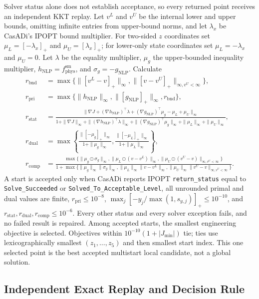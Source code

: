\documentclass[a4paper,fleqn]{cas-sc}
\begin{document}
Solver status alone does not establish acceptance, so every returned point receives an independent KKT replay. Let $v^L$ and $v^U$ be the internal lower and upper bounds, omitting infinite entries from upper-bound norms, and let $\lambda_x$ be CasADi's IPOPT bound multiplier. For two-sided $z$ coordinates set $\mu_L=[-\lambda_x]_+$ and $\mu_U=[\lambda_x]_+$; for lower-only state coordinates set $\mu_L=-\lambda_x$ and $\mu_U=0$. Let $\lambda$ be the equality multiplier, $\mu_g$ the upper-bounded inequality multiplier, $h_{\mathrm{NLP}}=f_{\mathrm{phys}}^{\mathrm{sm}}$, and $\sigma_g=-g_{\mathrm{NLP}}$. Calculate
\begin{align}
r_{\mathrm{bnd}}&=\max\{\|[v^L-v]_+\|_\infty,
\|[v-v^U]_+\|_{\infty,v^U<\infty}\},\\
r_{\mathrm{pri}}&=\max\{\|h_{\mathrm{NLP}}\|_\infty,
\|[g_{\mathrm{NLP}}]_+\|_\infty,r_{\mathrm{bnd}}\},\\
r_{\mathrm{stat}}&=
\frac{\|\nabla J+(\nabla h_{\mathrm{NLP}})^\top\lambda+
(\nabla g_{\mathrm{NLP}})^\top\mu_g-\mu_L+\mu_U\|_\infty}
{1+\|\nabla J\|_\infty+
\|(\nabla h_{\mathrm{NLP}})^\top\lambda\|_\infty+
\|(\nabla g_{\mathrm{NLP}})^\top\mu_g\|_\infty+
\|\mu_L\|_\infty+\|\mu_U\|_\infty},\\
r_{\mathrm{dual}}&=\max\!\left\{
\frac{\|[-\mu_g]_+\|_\infty}{1+\|\mu_g\|_\infty},
\frac{\|[-\mu_L]_+\|_\infty}{1+\|\mu_L\|_\infty}\right\},\\
r_{\mathrm{comp}}&=
\frac{\max\{\|\mu_g\odot\sigma_g\|_\infty,
\|\mu_L\odot(v-v^L)\|_\infty,
\|\mu_U\odot(v^U-v)\|_{\infty,v^U<\infty}\}}
{1+\max\{\|\mu_g\|_\infty\|\sigma_g\|_\infty,
\|\mu_L\|_\infty\|v-v^L\|_\infty,
\|\mu_U\|_\infty\|v^U-v\|_{\infty,v^U<\infty}\}}.
\end{align}
A start is accepted only when CasADi reports IPOPT \texttt{return\_status} equal to \texttt{Solve\_Succeeded} or \texttt{Solved\_To\_Acceptable\_Level}, all unrounded primal and dual values are finite, $r_{\mathrm{pri}}\leq10^{-8}$, $\max_j[-y_j/\max(1,s_{y,j})]_+\leq10^{-10}$, and $r_{\mathrm{stat}},r_{\mathrm{dual}},r_{\mathrm{comp}}\leq10^{-6}$. Every other status and every solver exception fails, and no failed result is repaired. Among accepted starts, the smallest engineering objective is selected. Objectives within $10^{-10}(1+|J_{\min}|)$ tie; ties use lexicographically smallest $(z_1,\ldots,z_5)$ and then smallest start index. This one selected point is the best accepted multistart local candidate, not a global solution.

\subsection{Independent Exact Replay and Decision Rule}
\end{document}
